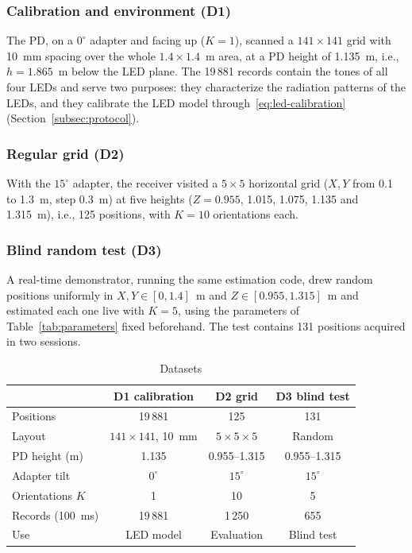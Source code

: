 \subsubsection{Calibration and environment (D1)}
The PD, on a $0^\circ$ adapter and facing up ($K=1$), scanned a $141\times141$ grid with 10~mm spacing over the whole $1.4\times1.4$~m area, at a PD height of 1.135~m, i.e., $h=1.865$~m below the LED plane. The 19\,881 records contain the tones of all four LEDs and serve two purposes: they characterize the radiation patterns of the LEDs, and they calibrate the LED model through~\eqref{eq:led-calibration} (Section~\ref{subsec:protocol}).

\subsubsection{Regular grid (D2)}
With the $15^\circ$ adapter, the receiver visited a $5\times5$ horizontal grid ($X,Y$ from 0.1 to 1.3~m, step 0.3~m) at five heights ($Z=0.955$, 1.015, 1.075, 1.135 and 1.315~m), i.e., 125 positions, with $K=10$ orientations each. 

\subsubsection{Blind random test (D3)}
A real-time demonstrator, running the same estimation code, drew random positions uniformly in $X,Y\in[0,1.4]$~m and $Z\in[0.955,1.315]$~m and estimated each one live with $K=5$, using the parameters of Table~\ref{tab:parameters} fixed beforehand. The test contains 131 positions acquired in two sessions.

\begin{table}[!t]
 \centering
 \caption{Datasets}
 \label{tab:datasets}
 \footnotesize
 \setlength{\tabcolsep}{3pt}
 \begin{tabular}{@{}lccc@{}}
 \toprule
 & D1 calibration & D2 grid & D3 blind test\\
 \midrule
 Positions & 19\,881 & 125 & 131\\
 Layout & $141\times141$, 10~mm & $5\times5\times5$ & Random\\
 PD height (m) & 1.135 & 0.955--1.315 & 0.955--1.315\\
 Adapter tilt & $0^\circ$ & $15^\circ$ & $15^\circ$\\
 Orientations $K$ & 1 & 10 & 5\\
 Records (100~ms) & 19\,881 & 1\,250 & 655\\
 Use & LED model & Evaluation & Blind test\\
 \bottomrule
 \end{tabular}
\end{table}

